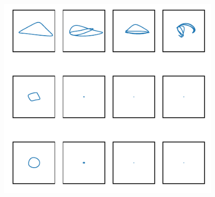 \begin{figure}[htp]
    \centering
    \includegraphics[width=12cm]{latex/figures/TL_untrained_projection.pdf}
    \caption{}
    \label{fig:QNN_vanishing}
\end{figure}


